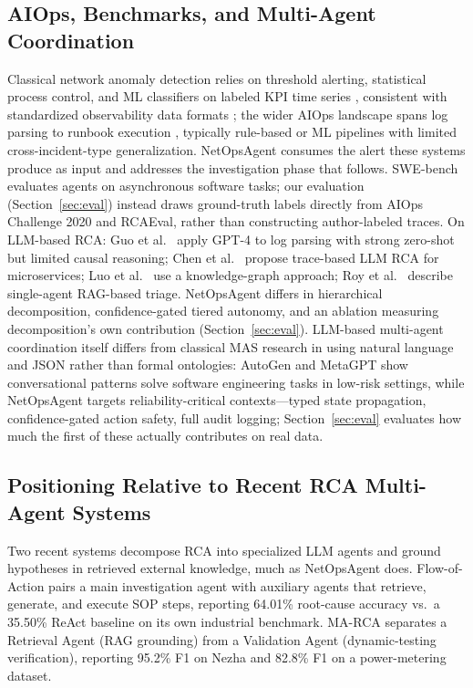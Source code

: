 \documentclass[10pt,conference]{IEEEtran}
\begin{document}
\subsection{AIOps, Benchmarks, and Multi-Agent Coordination}
Classical network anomaly detection relies on threshold alerting,
statistical process control, and ML classifiers on labeled KPI time series
\cite{zhao2020aiops}, consistent with standardized observability data
formats \cite{opentelemetry2024}; the wider AIOps landscape spans log
parsing \cite{liu2023logprompt} to runbook execution \cite{winters2020seag},
typically rule-based or ML pipelines with limited cross-incident-type
generalization. NetOpsAgent consumes the alert these systems produce as
input and addresses the investigation phase that follows. SWE-bench
\cite{jimenez2024swebench,jimenez2024swebenchverified} evaluates agents on
asynchronous software tasks; our evaluation (Section~\ref{sec:eval})
instead draws ground-truth labels directly from AIOps Challenge 2020
\cite{zhao2020aiops} and RCAEval, rather than constructing author-labeled
traces. On LLM-based RCA: Guo et al.\ \cite{guo2023chatgptevent} apply
GPT-4 to log parsing with strong zero-shot but limited causal reasoning;
Chen et al.\ \cite{chen2024eurosys} propose trace-based LLM RCA for
microservices; Luo et al.\ \cite{luo2022issre} use a knowledge-graph
approach; Roy et al.\ \cite{roy2024llmrca} describe single-agent RAG-based
triage. NetOpsAgent differs in hierarchical decomposition, confidence-gated
tiered autonomy, and an ablation measuring decomposition's own contribution
(Section~\ref{sec:eval}). LLM-based multi-agent coordination itself differs
from classical MAS research in using natural language and JSON rather than
formal ontologies: AutoGen \cite{wu2023autogen} and MetaGPT
\cite{hong2023metagpt} show conversational patterns solve software
engineering tasks in low-risk settings, while NetOpsAgent targets
reliability-critical contexts---typed state propagation, confidence-gated
action safety, full audit logging; Section~\ref{sec:eval} evaluates how
much the first of these actually contributes on real data.

\subsection{Positioning Relative to Recent RCA Multi-Agent Systems}
\label{sec:novelty}
Two recent systems decompose RCA into specialized LLM agents and ground
hypotheses in retrieved external knowledge, much as NetOpsAgent does.
Flow-of-Action \cite{pei2025flowofaction} pairs a main investigation agent
with auxiliary agents that retrieve, generate, and execute SOP steps,
reporting 64.01\% root-cause accuracy vs.\ a 35.50\% ReAct baseline on its
own industrial benchmark. MA-RCA \cite{fu2026marca} separates a Retrieval
Agent (RAG grounding) from a Validation Agent (dynamic-testing
verification), reporting 95.2\% F1 on Nezha and 82.8\% F1 on a
power-metering dataset.
\end{document}
